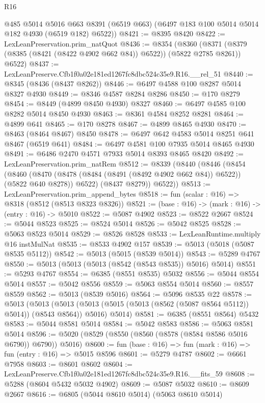 \begin{lexlean}{R16}
\begin{coremodule}
      @485
      @5014
      @5016
      @663
      @8391
      (@6519 @663)
      (@6497 @183 @100 @5014 @5014 @182 @4930 (@6519 @182) @6522))
@8421 := @8395 @8420
@8422 := LexLeanPreservation.prim_natQuot
@8436 := @8354
    (@8360 (@8371 (@8379 (@8385 (@8421 (@8422 @4902 @662 @84)) @6522)) (@5822 @2785 @8261)) @6522)
@8437 := LexLeanPreserve.Cfb1f0a02e181ed1267fc8dbc524c35e9.R16.__rel_51
@8440 := @8345 (@8436 (@8437 @8262))
@8446 := @6497 @4588 @100 @8287 @5014 @8327 @4930
@8449 := @8346 @4587 @8284 @8286
@8450 := @170 @8279
@8454 := @8449 (@4899 @8450 @4930) @8327
@8460 := @6497 @4585 @100 @8282 @5014 @8450 @4930
@8463 := @8361 @4584 @8252 @8281
@8464 := @4899 @641
@8465 := @170 @8278
@8467 := @4899 @8465 @4930
@8470 := @8463 (@8464 @8467) @8450
@8478 := @6497 @642 @4583 @5014 @8251 @641 @8467 (@6519 @641)
@8484 := @6497 @4581 @100 @7935 @5014 @8465 @4930
@8491 := @6486 @2470 @4571 @7933 @5014 @8393 @8465 @8420
@8492 := LexLeanPreservation.prim_natRem
@8512 := @8339
    (@8440
      (@8446
        (@8454
          (@8460
            (@8470 (@8478 (@8484 (@8491 (@8492 @4902 @662 @84)) @6522)) (@5822 @640 @8278))
            @6522)
          (@8437 @8279))
        @6522))
@8513 := LexLeanPreservation.prim_append_bytes
@8518 := fun (scalar : @16) => @8318 (@8512 (@8513 @8323 @8326))
@8521 := (base : @16) -> (mark : @16) -> (entry : @16) -> @5010
@8522 := @5087 @4902
@8523 := @8522 @2667
@8524 := @5044 @8523
@8525 := @8524 @5014
@8526 := @5042 @8525
@8528 := @5063 @8523 @5014
@8529 := @8526 @8528
@8533 := LexLeanRuntime.multiply @16 instMulNat
@8535 := @8533 @4902 @157
@8539 := @5013 (@5018 (@5087 @8535 @5112))
@8542 := @5013 (@5015 (@8539 @5014))
@8543 := @5289 @4767
@8550 := @5013 (@5013 (@5013 (@8542 (@8543 @8535)) @5016) @5014)
@8551 := @5293 @4767
@8554 := @6385 (@8551 @8535) @5032
@8556 := @5044 @8554 @5014
@8557 := @5042 @8556
@8559 := @5063 @8554 @5014
@8560 := @8557 @8559
@8562 := @5013 (@8539 @5016)
@8564 := @5096 @8535 @22
@8578 := @5013
    (@5013
      (@5013 (@5013 (@5015 (@5013 (@8562 (@5087 @8564 @5112)) @5014)) (@8543 @8564)) @5016)
      @5014)
@8581 := @6385 (@8551 @8564) @5432
@8583 := @5044 @8581 @5014
@8584 := @5042 @8583
@8586 := @5063 @8581 @5014
@8596 := @5020 (@8529 (@8550 (@8560 (@8578 (@8584 @8586 @5016 @6790)) @6790)) @5016)
@8600 := fun (base : @16) => fun (mark : @16) => fun (entry : @16) => @5015 @8596
@8601 := @5279 @4787
@8602 := @6661 @7958
@8603 := @8601 @8602
@8604 := LexLeanPreserve.Cfb1f0a02e181ed1267fc8dbc524c35e9.R16.__fits_59
@8608 := @5288 (@8604 @5432 @5032 @4902)
@8609 := @5087 @5032
@8610 := @8609 @2667
@8616 := @6805 (@5044 @8610 @5014) (@5063 @8610 @5014)

\end{coremodule}
\end{lexlean}
